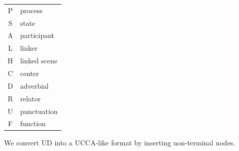 \documentclass[extrafontsizes,60pt,twocolumn]{memoir}
\begin{document}
\begin{minipage}{.1\columnwidth}
  \begin{center}
  \begin{adjustbox}{margin=2mm,frame,scale=.75,bgcolor=white}
  \color{blue}
  \begin{tabular}{>{\ttfamily}cl}
	  P & process \\
	  S & state \\
	  A & participant \\
	  L & linker \\
	  H & linked scene \\
	  C & center \\
	  D & adverbial \\
	  R & relator \\
	  U & punctuation \\
	  F & function \\
  \end{tabular}
  \end{adjustbox}
  \end{center}
\end{minipage}


We convert UD into a UCCA-like format by inserting non-terminal nodes.
\end{document}

